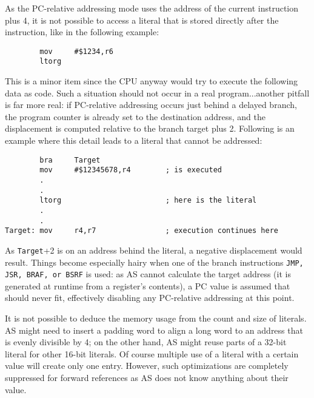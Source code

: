 \documentclass[12pt,twoside]{report}
\newcommand{\tty}[1]{{\tt #1}}
\begin{document}
As the PC-relative addressing mode uses the address of the current
instruction plus 4, it is not possible to access a literal that is
stored directly after the instruction, like in the following example:
\begin{verbatim}
        mov     #$1234,r6
        ltorg
\end{verbatim}
This is a minor item since the CPU anyway would try to execute the
following data as code.  Such a situation should not occur in a real
program...another pitfall is far more real: if PC-relative addressing
occurs just behind a delayed branch, the program counter is already
set to the destination address, and the displacement is computed
relative to the branch target plus 2.  Following is an example where
this detail leads to a literal that cannot be addressed:
\begin{verbatim}
        bra     Target
        mov     #$12345678,r4        ; is executed
        .
        .
        ltorg                        ; here is the literal
        .
        .
Target: mov     r4,r7                ; execution continues here
\end{verbatim}
As \tty{Target}+2 is on an address behind the literal, a negative
displacement would result.  Things become especially hairy when one
of the branch instructions \tty{JMP, JSR, BRAF, or BSRF} is used: as AS
cannot calculate the target address (it is generated at runtime from
a register's contents), a PC value is assumed that should never fit,
effectively disabling any PC-relative addressing at this point.

It is not possible to deduce the memory usage from the count and size
of literals.  AS might need to insert a padding word to align a long
word to an address that is evenly divisible by 4; on the other hand,
AS might reuse parts of a 32-bit literal for other 16-bit literals.
Of course multiple use of a literal with a certain value will create
only one entry.  However, such optimizations are completely
suppressed for forward references as AS does not know anything about
their value.
\end{document}
